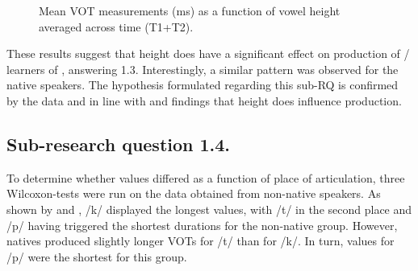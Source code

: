\documentclass[output=paper]{langsci/langscibook}
\begin{document}
  
\begin{figure}
  
\caption{\label{fig:monje:6} Mean VOT measurements (ms) as a function of vowel height averaged across time (T1+T2).}
\end{figure}
 


These results suggest that  height does have a significant effect on  production of / learners of , answering  1.3. Interestingly, a similar pattern was observed for the native speakers. The hypothesis formulated regarding this sub-RQ is confirmed by the data and in line with \citet{FlegeEtAl1998} and  findings that  height does influence  production. 



\subsection{Sub-research question 1.4.}



To determine whether  values differed as a function of place of articulation, three Wilcoxon-tests were run on the data obtained from non-native speakers. As shown by  and , /k/ displayed the longest  values, with /t/ in the second place and /p/ having triggered the shortest durations for the non-native group. However, natives produced slightly longer VOTs for /t/ than for /k/. In turn,  values for /p/ were the shortest for this group.
\end{document}
